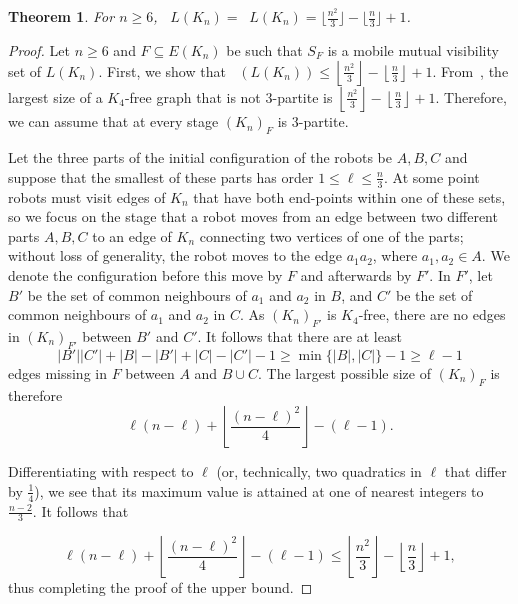 \documentclass[a4paper,12pt]{article}
\DeclareMathOperator{\mobmv}{Mob_{\mu}}
\DeclareMathOperator{\cmobmv}{Mob^*_{\mu}}
\newtheorem{theorem}{Theorem}[section]
\theoremstyle{definition}
\begin{document}
	\begin{theorem}
		For $n \geq 6$, $\mobmv{L(K_n)} = \cmobmv{L(K_n)} = \lfloor{\frac{n^2}{3}}\rfloor - \lfloor{\frac{n}{3}}\rfloor + 1$.
	\end{theorem}
	\begin{proof}
		Let $n \geq 6$ and $F\subseteq E(K_n)$ be such that $S_F$ is a mobile mutual visibility set of $L(K_n)$. First, we show that $\mobmv(L(K_n)) \leq  \left \lfloor{\frac{n^2}{3}} \right \rfloor - \left \lfloor{\frac{n}{3}} \right \rfloor + 1$. From~\cite[Theorem 14]{amin-2013}, the largest size of a $K_4$-free graph that is not $3$-partite is $\left \lfloor{\frac{n^2}{3}}\right \rfloor - \left \lfloor{\frac{n}{3}}\right \rfloor + 1$. Therefore, we can assume that at every stage $(K_n)_F$ is $3$-partite. 
		
		
		Let the three parts of the initial configuration of the robots be $A,B,C$ and suppose that the smallest of these parts has order $1 \leq \ell \leq \frac{n}{3}$. At some point robots must visit edges of $K_n$ that have both end-points within one of these sets, so we focus on the stage that a robot moves from an edge between two different parts $A,B,C$ to an edge of $K_n$ connecting two vertices of one of the parts; without loss of generality, the robot moves to the edge $a_1a_2$, where $a_1,a_2 \in A$. We denote the configuration before this move by $F$ and afterwards by $F'$. In $F'$, let $B'$ be the set of common neighbours of $a_1$ and $a_2$ in $B$, and $C'$ be the set of common neighbours of $a_1$ and $a_2$ in $C$. As $(K_n)_{F'}$ is $K_4$-free, there are no edges in $(K_n)_{F'}$ between $B'$ and $C'$. It follows that there are at least  \[ |B'||C'| + |B| - |B'| + |C| - |C'| - 1 \geq \min \{ |B|,|C|\}  - 1 \geq \ell - 1\] edges missing in $F$ between $A$ and $B \cup C$. The largest possible size of $(K_n)_F$ is therefore \begin{equation}
			\ell(n-\ell) + \left \lfloor{\frac{(n-\ell)^2}{4}} \right \rfloor - (\ell - 1).  \label{edgeineq}
		\end{equation}
		
		Differentiating with respect to $\ell $ (or, technically, two quadratics in $\ell $ that differ by $\frac{1}{4}$), we see that its maximum value is attained at one of nearest integers to $\frac{n-2}{3}$. It follows that 
		
		\begin{equation}
			\ell(n-\ell) + \left \lfloor{\frac{(n-\ell)^2}{4}} \right \rfloor - (\ell - 1) \leq \left \lfloor{\frac{n^2}{3}} \right \rfloor - \left \lfloor{\frac{n}{3}} \right \rfloor + 1,  
		\end{equation}
		thus completing the proof of the upper bound.
		

\end{proof}
\end{document}

